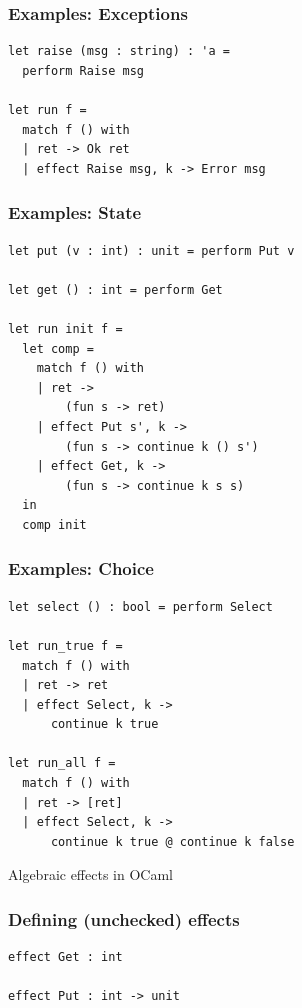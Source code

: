 \documentclass{beamer}
\begin{document}
\begin{frame}[fragile]
\frametitle{Examples: Exceptions}
\begin{lstlisting}[style=ocaml]
let raise (msg : string) : 'a =
  perform Raise msg

let run f =
  match f () with
  | ret -> Ok ret
  | effect Raise msg, k -> Error msg
\end{lstlisting}
\end{frame}

\begin{frame}[fragile]
\frametitle{Examples: State}
\begin{lstlisting}[style=ocaml]
let put (v : int) : unit = perform Put v

let get () : int = perform Get

let run init f =
  let comp =
    match f () with
    | ret ->
        (fun s -> ret)
    | effect Put s', k ->
        (fun s -> continue k () s')
    | effect Get, k ->
        (fun s -> continue k s s)
  in
  comp init
\end{lstlisting}
\end{frame}

\begin{frame}[fragile]
\frametitle{Examples: Choice}
\begin{lstlisting}[style=ocaml]
let select () : bool = perform Select

let run_true f =
  match f () with
  | ret -> ret
  | effect Select, k ->
      continue k true

let run_all f =
  match f () with
  | ret -> [ret]
  | effect Select, k ->
      continue k true @ continue k false
\end{lstlisting}
\end{frame}


\begin{frame}[c]
\begin{center}
\Huge Algebraic effects in OCaml
\end{center}
\end{frame}

\begin{frame}[fragile]
\frametitle{Defining (unchecked) effects}
\begin{lstlisting}[style=ocaml]
effect Get : int

effect Put : int -> unit
\end{lstlisting}
\end{frame}
\end{document}
